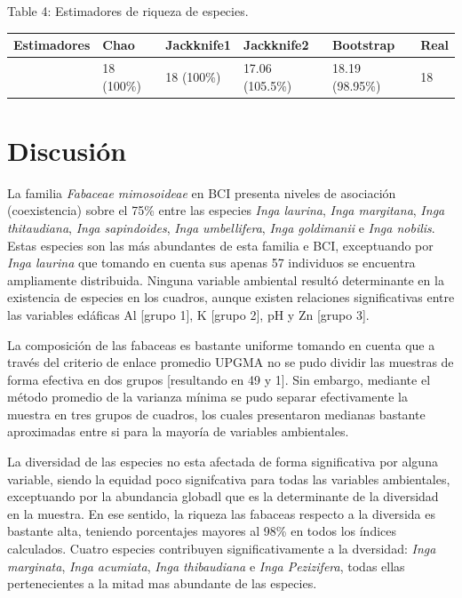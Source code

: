\documentclass[11pt,]{article}
\begin{document}
Table 4: Estimadores de riqueza de especies. \label{tab:est}

\begin{longtable}[]{@{}llllll@{}}
\toprule
Estimadores & Chao & Jackknife1 & Jackknife2 & Bootstrap &
Real\tabularnewline
\midrule
\endhead
& 18 (100\%) & 18 (100\%) & 17.06 (105.5\%) & 18.19 (98.95\%) &
18\tabularnewline
\bottomrule
\end{longtable}

\section{Discusión}\label{discusiuxf3n}

La familia \emph{Fabaceae mimosoideae} en BCI presenta niveles de
asociación (coexistencia) sobre el 75\% entre las especies \emph{Inga
laurina}, \emph{Inga margitana}, \emph{Inga thitaudiana}, \emph{Inga
sapindoides}, \emph{Inga umbellifera}, \emph{Inga goldimanii} e
\emph{Inga nobilis}. Estas especies son las más abundantes de esta
familia e BCI, exceptuando por \emph{Inga laurina} que tomando en cuenta
sus apenas 57 individuos se encuentra ampliamente distribuida. Ninguna
variable ambiental resultó determinante en la existencia de especies en
los cuadros, aunque existen relaciones significativas entre las
variables edáficas Al {[}grupo 1{]}, K {[}grupo 2{]}, pH y Zn {[}grupo
3{]}.

La composición de las fabaceas es bastante uniforme tomando en cuenta
que a través del criterio de enlace promedio UPGMA no se pudo dividir
las muestras de forma efectiva en dos grupos {[}resultando en 49 y 1{]}.
Sin embargo, mediante el método promedio de la varianza mínima se pudo
separar efectivamente la muestra en tres grupos de cuadros, los cuales
presentaron medianas bastante aproximadas entre si para la mayoría de
variables ambientales.

La diversidad de las especies no esta afectada de forma significativa
por alguna variable, siendo la equidad poco signifcativa para todas las
variables ambientales, exceptuando por la abundancia globadl que es la
determinante de la diversidad en la muestra. En ese sentido, la riqueza
las fabaceas respecto a la diversida es bastante alta, teniendo
porcentajes mayores al 98\% en todos los índices calculados. Cuatro
especies contribuyen significativamente a la dversidad: \emph{Inga
marginata}, \emph{Inga acumiata}, \emph{Inga thibaudiana} e \emph{Inga
Pezizifera}, todas ellas pertenecientes a la mitad mas abundante de las
especies.
\end{document}
